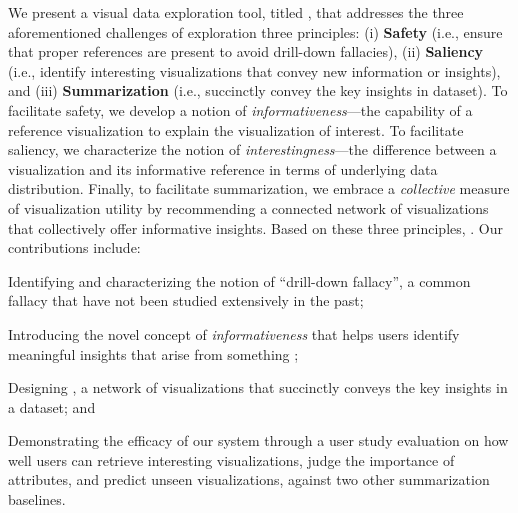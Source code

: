  \par 
 We present a visual data exploration tool, titled \system, 
 that addresses the three aforementioned 
 challenges of exploration 
 three principles: 
 (i) \textbf{Safety} 
 (i.e., ensure that proper 
 references are present to 
 avoid drill-down fallacies), 
 (ii) \textbf{Saliency} 
 (i.e., identify interesting visualizations 
 that convey new information or insights), 
 and (iii) \textbf{Summarization} 
 (i.e., succinctly convey the key 
 insights in  dataset). 
 To facilitate safety, we develop a 
 notion of \emph{informativeness}---the capability 
 of a reference  
 visualization to explain the visualization of interest. 
 To facilitate saliency, 
 we characterize the notion of \emph{interestingness}---the 
 difference between a visualization and 
 its informative reference 
 in terms of underlying data distribution. 
 Finally, to facilitate summarization, 
 we embrace a \emph{collective} measure of 
 visualization utility by recommending a 
 connected network of visualizations that collectively 
 offer informative insights. 
 Based on these three principles, 
 . 
 Our contributions include:
\begin{denselist}
\item Identifying and characterizing 
the notion of ``drill-down fallacy'', a common fallacy 
that have not been studied extensively in the past;
\item Introducing the novel concept of \emph{informativeness} 
that helps users identify meaningful insights 
that arise from something 
;
\item Designing \system,
 a network of visualizations that succinctly conveys 
 the key insights in a dataset; and 
\item Demonstrating the efficacy of our system through a user study evaluation on how well users can retrieve interesting visualizations, judge the importance of attributes, and predict unseen visualizations, against two other summarization baselines.
\end{denselist}
